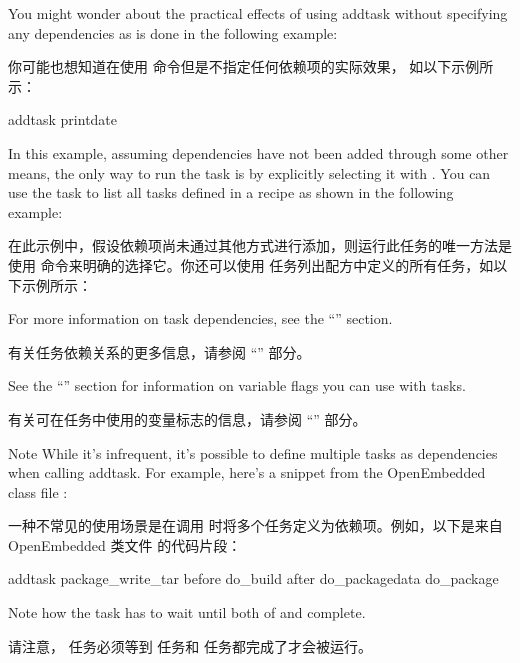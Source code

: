 You might wonder about the practical effects of using addtask without specifying any dependencies as is done in the following example:

你可能也想知道在使用  命令但是不指定任何依赖项的实际效果， 如以下示例所示：

\begin{pyglist}
addtask printdate
\end{pyglist}

In this example, assuming dependencies have not been added through some other means, the only way to run the task is by explicitly selecting it with . You can use the  task to list all tasks defined in a recipe as shown in the following example:

在此示例中，假设依赖项尚未通过其他方式进行添加，则运行此任务的唯一方法是使用  命令来明确的选择它。你还可以使用  任务列出配方中定义的所有任务，如以下示例所示：


For more information on task dependencies, see the ``'' section.

有关任务依赖关系的更多信息，请参阅 ``'' 部分。

See the ``'' section for information on variable flags you can use with tasks.

有关可在任务中使用的变量标志的信息，请参阅 ``'' 部分。


\begin{noteblock}{Note}%
While it's infrequent, it's possible to define multiple tasks as dependencies when calling addtask. For example, here's a snippet from the OpenEmbedded class file :

\medskip
一种不常见的使用场景是在调用  时将多个任务定义为依赖项。例如，以下是来自 OpenEmbedded 类文件  的代码片段：

\medskip
\begin{pyglist}
addtask package_write_tar before do_build after do_packagedata do_package
\end{pyglist}

\medskip
Note how the  task has to wait until both of  and  complete.

\medskip
请注意， 任务必须等到  任务和  任务都完成了才会被运行。
\end{noteblock}

